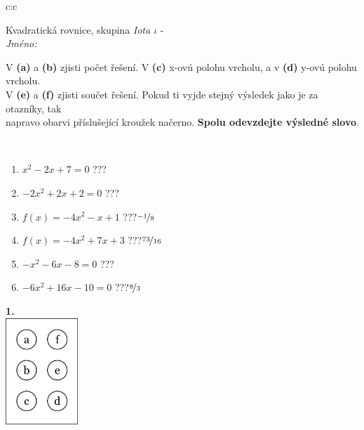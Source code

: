 \documentclass[10pt]{report}
\begin{document}
\begin{tabular}{c:c}
\begin{minipage}[c][104.5mm][t]{0.5\linewidth}
\begin{center}
\vspace{7mm}
{\huge Kvadratická rovnice, skupina \textit{Iota $\iota$} -}\\[5mm]
\textit{Jméno:}\phantom{xxxxxxxxxxxxxxxxxxxxxxxxxxxxxxxxxxxxxxxxxxxxxxxxxxxxxxxxxxxxxxxxx}\\[5mm]
\begin{minipage}{0.95\linewidth}
\begin{center}
V \textbf{(a)} a \textbf{(b)} zjisti počet řešení. V \textbf{(c)} x-ovú polohu vrcholu, a v \textbf{(d)} y-ovú polohu vrcholu.\\V \textbf{(e)} a \textbf{(f)} zjisti součet řešení. Pokud ti vyjde stejný výsledek jako je za otazníky, tak\\napravo obarvi příslušející kroužek načerno. \textbf{Spolu odevzdejte výsledné slovo}.
\end{center}
\end{minipage}
\\[1mm]
\begin{minipage}{0.79\linewidth}
\begin{center}
\begin{varwidth}{\linewidth}
\begin{enumerate}
\Large
\item $x^2-2x+7=0$\quad \dotfill\; ???\;\dotfill {}
\item $-2x^2+2x+2=0$\quad \dotfill\; ???\;\dotfill {}
\item $f(x)=-4x^2-x+1$\quad \dotfill\; ???\;\dotfill \quad $\nicefrac{-1}{8}$
\item $f(x)=-4x^2+7x+3$\quad \dotfill\; ???\;\dotfill \quad $\nicefrac{73}{16}$
\item $-x^2-6x-8=0$\quad \dotfill\; ???\;\dotfill {}
\item $-6x^2+16x-10=0$\quad \dotfill\; ???\;\dotfill \quad $\nicefrac{8}{3}$
\end{enumerate}
\end{varwidth}
\end{center}
\end{minipage}
\begin{minipage}{0.20\linewidth}
\begin{center}
{\Huge\bfseries 1.} \\[2mm]
\includegraphics[height=40mm]{../images/braille.png}

\end{center}
\end{minipage}
\end{center}
\end{minipage}
\end{tabular}
\end{document}
